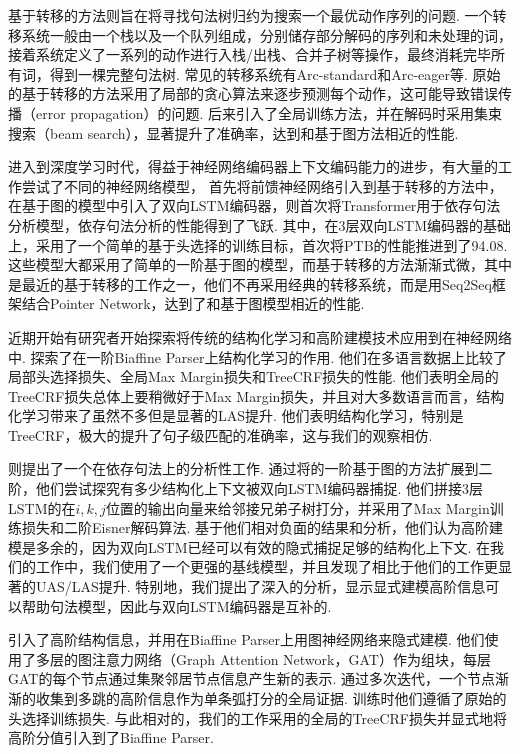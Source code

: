基于转移的方法则旨在将寻找句法树归约为搜索一个最优动作序列的问题.
一个转移系统一般由一个栈以及一个队列组成，分别储存部分解码的序列和未处理的词，接着系统定义了一系列的动作进行入栈/出栈、合并子树等操作，最终消耗完毕所有词，得到一棵完整句法树.
常见的转移系统有Arc-standard和Arc-eager等.
原始的基于转移的方法采用了局部的贪心算法来逐步预测每个动作，这可能导致错误传播（error propagation）的问题.
后来\citet{zhang-clark-2008-tale,huang-etal-2009-bilingually}引入了全局训练方法，并在解码时采用集束搜索（beam search），显著提升了准确率，达到和基于图方法相近的性能.

进入到深度学习时代，得益于神经网络编码器上下文编码能力的进步，有大量的工作尝试了不同的神经网络模型，
\citet{chen-manning-2014-fast}首先将前馈神经网络引入到基于转移的方法中，\citet{kiperwasser-goldberg-2016-simple,wang-chang-2016-graph}在基于图的模型中引入了双向LSTM编码器，\citet{li-etal-2019-attentive}则首次将Transformer用于依存句法分析模型，依存句法分析的性能得到了飞跃.
其中，\citet{dozat-etal-2017-biaffine}在3层双向LSTM编码器的基础上，采用了一个简单的基于头选择的训练目标，首次将PTB的性能推进到了94.08.
这些模型大都采用了简单的一阶基于图的模型，而基于转移的方法渐渐式微，其中\citet{ma-etal-2018-stack}是最近的基于转移的工作之一，他们不再采用经典的转移系统，而是用Seq2Seq框架结合Pointer Network，达到了和基于图模型相近的性能.

近期开始有研究者开始探索将传统的结构化学习和高阶建模技术应用到在神经网络中.
\citet{zhang-etal-2019-empirical}探索了在一阶Biaffine Parser上结构化学习的作用.
他们在多语言数据上比较了局部头选择损失、全局Max Margin损失和TreeCRF损失的性能.
他们表明全局的TreeCRF损失总体上要稍微好于Max Margin损失，并且对大多数语言而言，结构化学习带来了虽然不多但是显著的LAS提升.
他们表明结构化学习，特别是TreeCRF，极大的提升了句子级匹配的准确率，这与我们的观察相仿.

\citet{falenska-kuhn-2019-non}则提出了一个在依存句法上的分析性工作.
通过将\citet{kiperwasser-goldberg-2016-simple}的一阶基于图的方法扩展到二阶，他们尝试探究有多少结构化上下文被双向LSTM编码器捕捉.
他们拼接3层LSTM的在$i,k,j$位置的输出向量来给邻接兄弟子树打分，并采用了Max Margin训练损失和二阶Eisner解码算法\citep{mcdonald-pereira-2006-online}.
基于他们相对负面的结果和分析，他们认为高阶建模是多余的，因为双向LSTM已经可以有效的隐式捕捉足够的结构化上下文.
在我们的工作中，我们使用了一个更强的基线模型，并且发现了相比于他们的工作更显著的UAS/LAS提升.
特别地，我们提出了深入的分析，显示显式建模高阶信息可以帮助句法模型，因此与双向LSTM编码器是互补的.

\citet{ji-etal-2019-graph}引入了高阶结构信息，并用在Biaffine Parser\citep{dozat-etal-2017-biaffine}上用图神经网络来隐式建模.
他们使用了多层的图注意力网络（Graph Attention Network，GAT）\citep{velickovic-etal-2018-graph}作为组块，每层GAT的每个节点通过集聚邻居节点信息产生新的表示.
通过多次迭代，一个节点渐渐的收集到多跳的高阶信息作为单条弧打分的全局证据.
训练时他们遵循了原始的头选择训练损失.
与此相对的，我们的工作采用的全局的TreeCRF损失并显式地将高阶分值引入到了Biaffine Parser.

